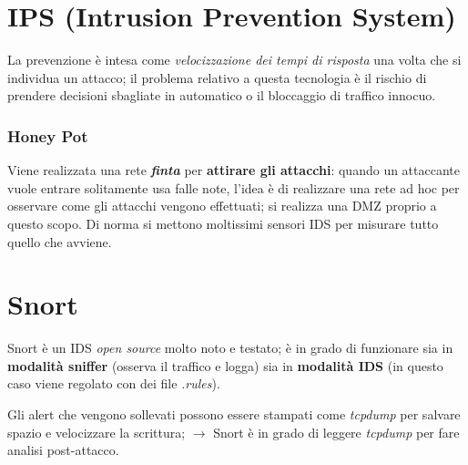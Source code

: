 \section{IPS (Intrusion Prevention System)}

La prevenzione è intesa come \textit{velocizzazione dei tempi di risposta} 
una volta che si individua un attacco; il problema relativo a questa tecnologia 
è il rischio di prendere decisioni sbagliate in automatico o il bloccaggio di 
traffico innocuo.

\subsubsection{Honey Pot}

Viene realizzata una rete \textbf{\textit{finta}} per \textbf{attirare gli attacchi}:
quando un attaccante vuole entrare solitamente usa falle note, l'idea è di realizzare 
una rete ad hoc per osservare come gli attacchi vengono effettuati; si realizza una 
DMZ proprio a questo scopo.
\noindent Di norma si mettono moltissimi sensori IDS per misurare tutto 
quello che avviene.

\section{Snort}
Snort è un IDS \textit{open source} molto noto e testato; è in grado di funzionare 
sia in \textbf{modalità sniffer} (osserva il traffico e logga) sia in 
\textbf{modalità IDS} (in questo caso viene regolato con dei file \textit{.rules}).

\noindent Gli alert che vengono sollevati possono essere stampati come \textit{tcpdump}
per salvare spazio e velocizzare la scrittura; $\rightarrow$ Snort è in grado di 
leggere \textit{tcpdump} per fare analisi post-attacco.

